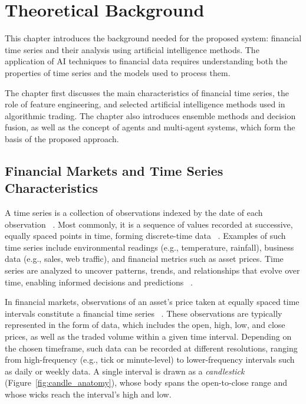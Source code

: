 \chapter{Theoretical Background}
\label{02_Theoretical_Background}
This chapter introduces the background needed for the proposed system: financial time series and their analysis using artificial intelligence methods. The application of AI techniques to financial data requires understanding both the properties of time series and the models used to process them.


The chapter first discusses the main characteristics of financial time series, the role of feature engineering, and selected artificial intelligence methods used in algorithmic trading. The chapter also introduces ensemble methods and decision fusion, as well as the concept of agents and multi-agent systems, which form the basis of the proposed approach.

\section{Financial Markets and Time Series Characteristics}

A time series is a collection of observations indexed by the date of each observation ~\cite{hamilton2020time}. Most commonly, it is a sequence of values recorded at successive, equally spaced points in time, forming discrete-time data ~\cite{bangert2021machine}. Examples of such time series include environmental readings (e.g., temperature, rainfall), business data (e.g., sales, web traffic), and financial metrics such as asset prices. Time series are analyzed to uncover patterns, trends, and relationships that evolve over time, enabling informed decisions and predictions ~\cite{zhang2024deep}.


In financial markets, observations of an asset’s price taken at equally spaced time intervals constitute a financial time series ~\cite{zhang2024deep}. These observations are typically represented in the form of  data, which includes the open, high, low, and close prices, as well as the traded volume within a given time interval. Depending on the chosen timeframe, such data can be recorded at different resolutions, ranging from high-frequency (e.g., tick or minute-level) to lower-frequency intervals such as daily or weekly data. A single interval is drawn as a \textit{candlestick} (Figure~\ref{fig:candle_anatomy}), whose body spans the open-to-close range and whose wicks reach the interval's high and low.

